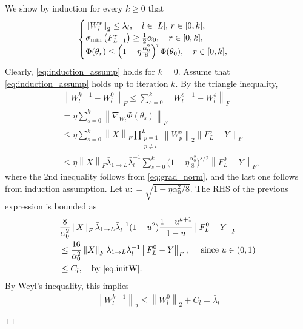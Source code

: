 \documentclass{article}
\newenvironment{proof}{\par\noindent{\bf Proof:\ }}{\hfill$\Box$\\[2mm]}
\newcommand{\norm}[1]{\left\|#1\right\|}
\newcommand{\svmin}[1]{\sigma_{\rm min}\left(#1\right)}
\def\bydef{\mathrel{\mathop:}=}
\begin{document}
\begin{proof}
    We show by induction for every $k\geq 0$ that
    \begin{align}\label{eq:induction_assump}
	\begin{cases}
	    \norm{W_l^r}_2\leq \bar{\lambda}_l, \quad l\in[L], \,r\in[0,k],\\
	    \svmin{F_{L-1}^r} \geq \frac{1}{2}\alpha_0,\quad r\in[0,k],\\
	    \Phi(\theta_r)\leq \Big(1-\eta\frac{\alpha_0^2}{8}\Big)^r \Phi(\theta_0),\quad r\in[0,k],
	\end{cases} 
    \end{align}
    Clearly, \eqref{eq:induction_assump} holds for $k=0.$
    Assume that \eqref{eq:induction_assump} holds up to iteration $k$.
    By the triangle inequality,
    \begin{align*}
	&\norm{W_l^{k+1}-W_l^0}_F 
	\leq\sum_{s=0}^{k} \norm{W_l^{s+1}-W_l^s}_F \\
	&=\eta\sum_{s=0}^{k} \norm{\nabla_{W_l}\Phi(\theta_s)}_F \\
	&\leq\eta\sum_{s=0}^{k} \norm{X}_F \prod_{\substack{p=1\\p\neq l}}^L\norm{W_p^s}_2 \norm{F_L^s-Y}_F\\
	    &\leq\eta\norm{X}_F \bar{\lambda}_{1\to L} \bar{\lambda}_l^{-1}
	    \sum_{s=0}^k \Big(1-\eta\frac{\alpha_0^2}{8}\Big)^{s/2} \norm{F_L^0-Y}_F, 
    \end{align*}	
    where the 2nd inequality follows from \eqref{eq:grad_norm}, and the last one follows from induction assumption. 
    Let $u\bydef\sqrt{1-\eta\alpha_0^2/8}$. The RHS of the previous expression is bounded as
    \begin{align*}
	&\frac{8}{\alpha_0^2} \norm{X}_F \bar{\lambda}_{1\to L} \bar{\lambda}_l^{-1} (1-u^2) \frac{1-u^{k+1}}{1-u} \norm{F_L^0-Y}_F\\
	&\leq \frac{16}{\alpha_0^2} \norm{X}_F \bar{\lambda}_{1\to L} \bar{\lambda}_l^{-1} \norm{F_L^0-Y}_F,\quad \textrm{ since } u\in (0, 1)\\
	&\leq C_l, \quad\textrm{by \eqref{eq:initW}} .
    \end{align*}
    By Weyl's inequality, this implies
    \begin{align}\label{eq:W_op}
	\norm{W_l^{k+1}}_2\leq \norm{W_l^0}_2 + C_l = \bar{\lambda}_l
    \end{align}

\end{proof}
\end{document}
